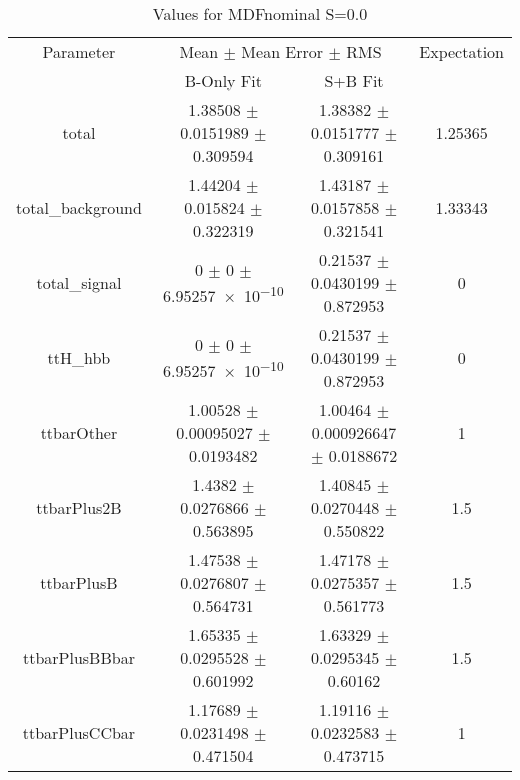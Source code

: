 \begin{table}
\centering
\caption{Values for MDFnominal S=0.0}
\begin{tabular}{cccc}
\toprule
Parameter & \multicolumn{2}{c}{Mean $\pm$ Mean Error $\pm$ RMS} & Expectation\\
 & B-Only Fit & S+B Fit & \\
\midrule
total & \num{1.38508} $\pm$ \num{0.0151989} $\pm$ \num{0.309594} & \num{1.38382} $\pm$ \num{0.0151777} $\pm$ \num{0.309161} & \num{1.25365}\\
total\_background & \num{1.44204} $\pm$ \num{0.015824} $\pm$ \num{0.322319} & \num{1.43187} $\pm$ \num{0.0157858} $\pm$ \num{0.321541} & \num{1.33343}\\
total\_signal & \num{0} $\pm$ \num{0} $\pm$ \num{6.95257e-10} & \num{0.21537} $\pm$ \num{0.0430199} $\pm$ \num{0.872953} & \num{0}\\
ttH\_hbb & \num{0} $\pm$ \num{0} $\pm$ \num{6.95257e-10} & \num{0.21537} $\pm$ \num{0.0430199} $\pm$ \num{0.872953} & \num{0}\\
ttbarOther & \num{1.00528} $\pm$ \num{0.00095027} $\pm$ \num{0.0193482} & \num{1.00464} $\pm$ \num{0.000926647} $\pm$ \num{0.0188672} & \num{1}\\
ttbarPlus2B & \num{1.4382} $\pm$ \num{0.0276866} $\pm$ \num{0.563895} & \num{1.40845} $\pm$ \num{0.0270448} $\pm$ \num{0.550822} & \num{1.5}\\
ttbarPlusB & \num{1.47538} $\pm$ \num{0.0276807} $\pm$ \num{0.564731} & \num{1.47178} $\pm$ \num{0.0275357} $\pm$ \num{0.561773} & \num{1.5}\\
ttbarPlusBBbar & \num{1.65335} $\pm$ \num{0.0295528} $\pm$ \num{0.601992} & \num{1.63329} $\pm$ \num{0.0295345} $\pm$ \num{0.60162} & \num{1.5}\\
ttbarPlusCCbar & \num{1.17689} $\pm$ \num{0.0231498} $\pm$ \num{0.471504} & \num{1.19116} $\pm$ \num{0.0232583} $\pm$ \num{0.473715} & \num{1}\\
\bottomrule
\end{tabular}
\end{table}
